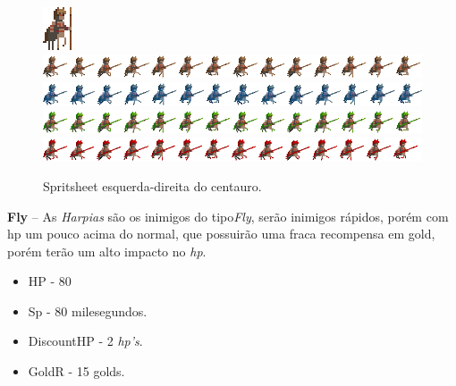 \documentclass[11pt]{article} %
\begin{document}
\begin{figure}[!htp]
\centering
\advance\leftskip-3cm
\advance\rightskip-3cm
\includegraphics[scale=2]{res/units/centauro/centauro.png} \quad
\includegraphics[scale=0.7]{res/units/centauro/centaurosheet.png} \quad
\includegraphics[scale=0.7]{res/units/centauro/centaurosheet_congelado.png} \quad
\includegraphics[scale=0.7]{res/units/centauro/centaurosheet_verde.png} \quad
\includegraphics[scale=0.7]{res/units/centauro/centaurosheet_vermelho.png} 
\caption{Spritsheet esquerda-direita do centauro.}
\label{centaurosheet}
\end{figure}

\newpage

\textbf{{\large Fly}} – As \textit{Harpias} são os inimigos do tipo\textit{Fly}, serão inimigos rápidos, porém com hp um pouco acima do normal, que possuirão uma fraca recompensa em gold, porém terão um alto impacto no \textit{hp}.

\begin{itemize}
\item HP - 80
\item Sp - 80 milesegundos.
\item DiscountHP - 2 \textit{hp's}.
\item GoldR - 15 golds.
\end{itemize}
\end{document}

